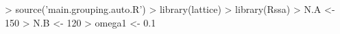 \begin{CodeChunk}
\begin{CodeInput}


> source('main.grouping.auto.R')
> library(lattice)
> library(Rssa)
> N.A <- 150
> N.B <- 120
> omega1 <- 0.1
\end{CodeInput}

\end{CodeChunk}